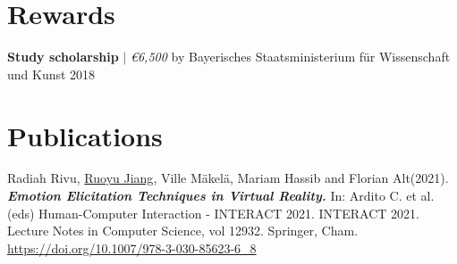 \documentclass[letterpaper,11pt]{article}
\begin{document}
 \section{Rewards}
 {\textbf{Study scholarship} $|$ \emph{\euro 6,500} by Bayerisches Staatsministerium für Wissenschaft und Kunst }{2018}
  
 \section{Publications}
 Radiah Rivu, \underline{Ruoyu Jiang}, Ville Mäkelä, Mariam Hassib and Florian Alt(2021). \textbf{\textit{Emotion Elicitation Techniques in Virtual Reality.}} In: Ardito C. et al. (eds) Human-Computer Interaction - INTERACT 2021. INTERACT 2021. Lecture Notes in Computer Science, vol 12932. Springer, Cham. \url{https://doi.org/10.1007/978-3-030-85623-6_8} 

\end{document}
